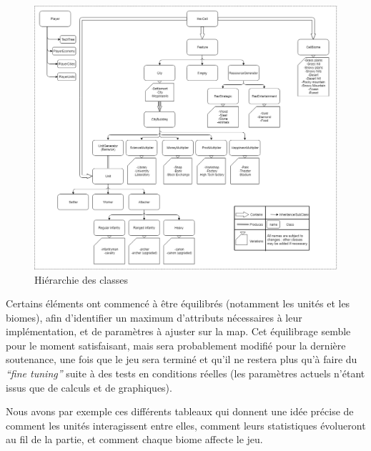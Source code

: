 \documentclass[12pt]{report}
\begin{document}
\begin{figure}[H]
    \centering
    \includegraphics[width=1\textwidth]{DIAG_CLASSES__hierarchy}
    \caption{Hiérarchie des classes}
\end{figure}

Certains éléments ont commencé à être équilibrés (notamment les unités et les biomes), afin d’identifier un maximum d’attributs nécessaires à leur implémentation, et de paramètres à ajuster sur la map. Cet équilibrage semble pour le moment satisfaisant, mais sera probablement modifié pour la dernière soutenance, une fois que le jeu sera terminé et qu’il ne restera plus qu’à faire du \textit{“fine tuning”} suite à des tests en conditions réelles (les paramètres actuels n’étant issus que de calculs et de graphiques).

Nous avons par exemple ces différents tableaux qui donnent une idée précise de comment les unités interagissent entre elles, comment leurs statistiques évolueront au fil de la partie, et comment chaque biome affecte le jeu.
\end{document}
